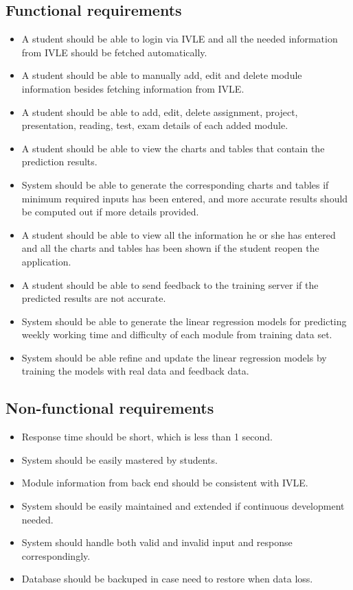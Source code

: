 \documentclass[fyp]{socreport}
\begin{document}
\subsection{Functional requirements}
\begin{itemize}
	\item A student should be able to login via IVLE and all the needed information from IVLE should be fetched automatically.
	\item A student should be able to manually add, edit and delete module information besides fetching information from IVLE.
	\item A student should be able to add, edit, delete assignment, project, presentation, reading, test, exam details of each added module.
	\item A student should be able to view the charts and tables that contain the prediction results.
	\item System should be able to generate the corresponding charts and tables if minimum required inputs has been entered, and more accurate results should be computed out if more details provided.
	\item A student should be able to view all the information he or she has entered and all the charts and tables has been shown if the student reopen the application.
	\item A student should be able to send feedback to the training server if the predicted results are not accurate.
	\item System should be able to generate the linear regression models for predicting weekly working time and difficulty of each module from training data set.
	\item System should be able refine and update the linear regression models by training the models with real data and feedback data.
\end{itemize}

\subsection{Non-functional requirements}
\begin{itemize}
	\item Response time should be short, which is less than 1 second.
	\item System should be easily mastered by students.
	\item Module information from back end should be consistent with IVLE.
	\item System should be easily maintained and extended if continuous development needed.
	\item System should handle both valid and invalid input and response correspondingly.
	\item Database should be backuped in case need to restore when data loss.
\end{itemize}
\end{document}

